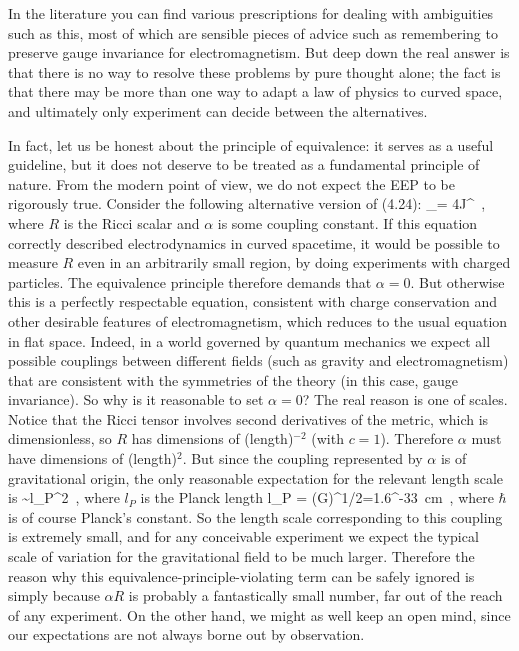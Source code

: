 \documentclass[12pt]{article}
\begin{document}
In the literature you can find various prescriptions for dealing with
ambiguities such as this, most of which are sensible pieces of advice such 
as remembering to preserve gauge invariance for electromagnetism.  But
deep down the real answer is that there is no way to resolve these
problems by pure thought alone; the fact is that there may be more
than one way to adapt a law of physics to curved space, and ultimately
only experiment can decide between the alternatives.

In fact, let us be honest about the principle of equivalence: it serves
as a useful guideline, but it does not deserve to be treated as a
fundamental principle of nature.  From the modern point of view, we
do not expect the EEP to be rigorously true.  Consider the following
alternative version of (4.24):
\be
  \nabla_\mu[(1+\alpha R)F^{\nu\mu}] = 4\pi J^\nu\ ,\label{4.32}
\ee
where $R$ is the Ricci scalar and $\alpha$ is some coupling constant.
If this equation correctly described electrodynamics in curved
spacetime, it would be possible to measure $R$ even in an arbitrarily
small region, by doing experiments with charged particles.  The 
equivalence principle therefore demands that $\alpha=0$.  But
otherwise this is a perfectly respectable equation, consistent with
charge conservation and other desirable features of electromagnetism,
which reduces to the usual equation in flat space.  Indeed, in a 
world governed by quantum mechanics we expect all possible couplings
between different fields (such as gravity and electromagnetism) that
are consistent with the symmetries of the theory (in this case,
gauge invariance).  So why is it reasonable to set $\alpha=0$? The
real reason is one of scales.  Notice that the Ricci tensor involves
second derivatives of the metric, which is dimensionless, so $R$
has dimensions of (length)$^{-2}$ (with $c=1$).  Therefore $\alpha$ must 
have dimensions of (length)$^{2}$.  But since the coupling represented by
$\alpha$ is of gravitational origin, the only reasonable expectation
for the relevant length scale is
\be
  \alpha \sim l_P^2\ ,\label{4.33}
\ee
where $l_P$ is the Planck length
\be
  l_P = \left({{G\hbar}}\right)^{1/2}=1.6^{-33}{\rm ~cm}\ ,\label{4.34}
\ee
where $\hbar$ is of course Planck's constant.  So the length scale
corresponding to this coupling is extremely small, and for any
conceivable experiment we expect the typical scale of variation for
the gravitational field to be much larger.  Therefore the reason why
this equivalence-principle-violating term can be safely ignored is 
simply because $\alpha R$ is probably a fantastically small number, far
out of the reach of any experiment.  On the other hand, we might as
well keep an open mind, since our expectations are not always borne
out by observation.
\end{document}

